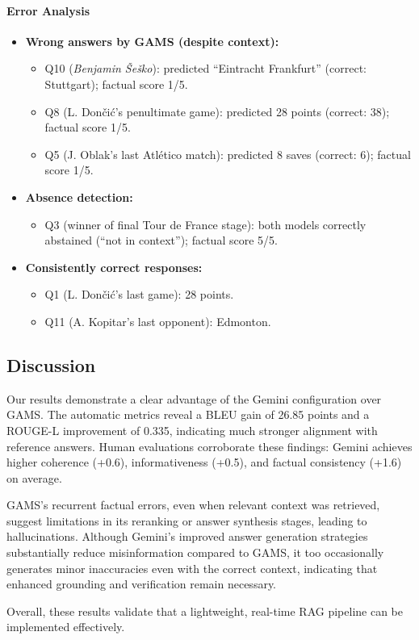 \documentclass[fleqn,moreauthors,10pt]{ds_report}
\begin{document}
\paragraph{Error Analysis}
\begin{itemize}
  \item \textbf{Wrong answers by GAMS (despite context):}
    \begin{itemize}
      \item Q10 (\emph{Benjamin Šeško}): predicted “Eintracht Frankfurt” (correct: Stuttgart); factual score 1/5.
      \item Q8 (L. Dončić’s penultimate game): predicted 28 points (correct: 38); factual score 1/5.
      \item Q5 (J. Oblak’s last Atlético match): predicted 8 saves (correct: 6); factual score 1/5.
    \end{itemize}
  \item \textbf{Absence detection:}
    \begin{itemize}
      \item Q3 (winner of final Tour de France stage): both models correctly abstained (“not in context”); factual score 5/5.
    \end{itemize}
  \item \textbf{Consistently correct responses:}
    \begin{itemize}
      \item Q1 (L. Dončić’s last game): 28 points.
      \item Q11 (A. Kopitar’s last opponent): Edmonton.
    \end{itemize}
\end{itemize}

\subsection*{Discussion}

Our results demonstrate a clear advantage of the Gemini configuration over GAMS. The automatic metrics reveal a BLEU gain of 26.85 points and a ROUGE-L improvement of 0.335, indicating much stronger alignment with reference answers. Human evaluations corroborate these findings: Gemini achieves higher coherence (+0.6), informativeness (+0.5), and factual consistency (+1.6) on average.

GAMS’s recurrent factual errors, even when relevant context was retrieved, suggest limitations in its reranking or answer synthesis stages, leading to hallucinations. Although Gemini’s improved answer generation strategies substantially reduce misinformation compared to GAMS, it too occasionally generates minor inaccuracies even with the correct context, indicating that enhanced grounding and verification remain necessary.

Overall, these results validate that a lightweight, real-time RAG pipeline can be implemented effectively.  



\end{document}
